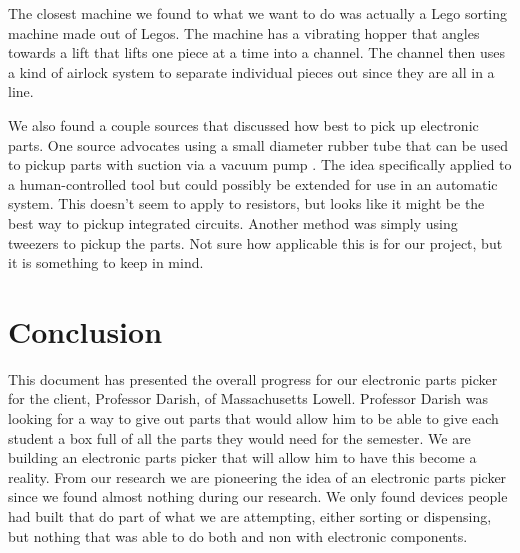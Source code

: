 \documentclass[12pt]{report}
\begin{document}
The closest machine we found to what we want to do was actually a Lego sorting machine made out of Legos. The machine has a vibrating hopper that angles towards a lift that lifts one piece at a time into a channel. The channel then uses a kind of airlock system to separate individual pieces out since they are all in a line\cite{legoSorter}.


We also found a couple sources that discussed how best to pick up electronic parts. One source advocates using a small diameter rubber tube that can be used to pickup parts with suction via a vacuum pump \cite{vacuumPick}. The idea specifically applied to a human-controlled tool but could possibly be extended for use in an automatic system. This doesn't seem to apply to resistors, but looks like it might be the best way to pickup integrated circuits. Another method was simply using tweezers to pickup the parts. Not sure how applicable this is for our project, but it is something to keep in mind.

\section*{Conclusion}

This document has presented the overall progress for our electronic parts picker for the client, Professor Darish, of Massachusetts Lowell. Professor Darish was looking for a way to give out parts that would allow him to be able to give each student a box full of all the parts they would need for the semester. We are building an electronic parts picker that will allow him to have this become a reality. From our research we are pioneering the idea of an electronic parts picker since we found almost nothing during our research. We only found devices people had built that do part of what we are attempting, either sorting or dispensing, but nothing that was able to do both and non with electronic components. 



\end{document}
